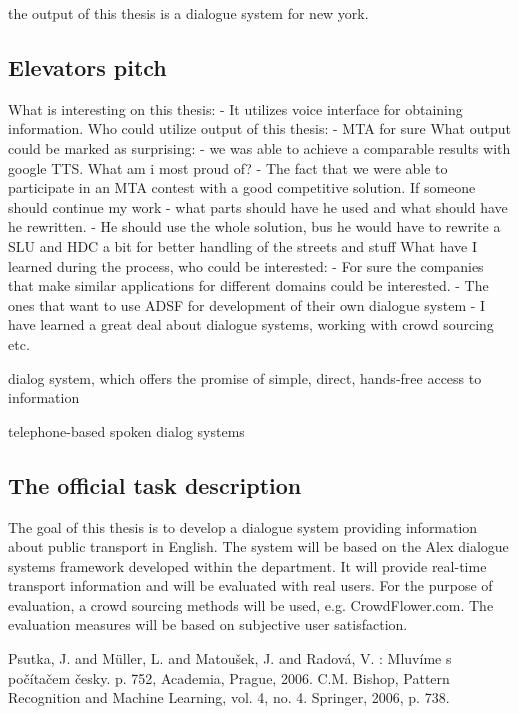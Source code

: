 the output of this thesis is a dialogue system for new york.

\subsection{Elevators pitch} %
\label{sub:elevators_pitch}

What is interesting on this thesis: 
 - It utilizes voice interface for obtaining information.
Who could utilize output of this thesis:
 - MTA for sure
What output could be marked as surprising:
 - we was able to achieve a comparable results with google TTS.
What am i most proud of?
 - The fact that we were able to participate in an MTA contest with a good competitive solution.
If someone should continue my work - what parts should have he used and what should have he rewritten.
 - He should use the whole solution, bus he would have to rewrite a SLU and HDC a bit for better handling of the streets and stuff
What have I learned during the process, who could be interested:
 - For sure the companies that make similar applications for different domains could be interested.
 - The ones that want to use ADSF for development of their own dialogue system
 - I have learned a great deal about dialogue systems, working with crowd sourcing etc.


 dialog system, which offers the promise
of simple, direct, hands-free access to information

 telephone-based spoken dialog systems

\subsection{The official task description} %
\label{sub:the_official_task_description}

The goal of this thesis is to develop a dialogue system providing information about public transport in English. The system will be based on the Alex dialogue systems framework developed within the department. It will provide real-time transport information and will be evaluated with real users. For the purpose of evaluation, a crowd sourcing methods will be used, e.g. CrowdFlower.com. The evaluation measures will be based on subjective user satisfaction. 


Psutka, J. and Müller, L. and Matoušek, J. and Radová, V. : Mluvíme s počítačem česky. p. 752, Academia, Prague, 2006.
C.M. Bishop, Pattern Recognition and Machine Learning, vol. 4, no. 4. Springer, 2006, p. 738.
